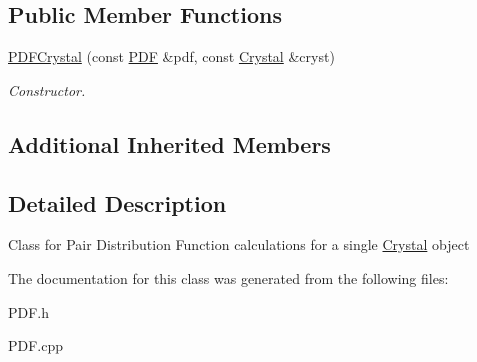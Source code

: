 \subsection*{Public Member Functions}
\begin{DoxyCompactItemize}
\item 
\mbox{\label{class_obj_cryst_1_1_p_d_f_crystal_a00392955dc22562f102b5161201df88e}} 
\mbox{\hyperlink{class_obj_cryst_1_1_p_d_f_crystal_a00392955dc22562f102b5161201df88e}{P\+D\+F\+Crystal}} (const \mbox{\hyperlink{class_obj_cryst_1_1_p_d_f}{P\+DF}} \&pdf, const \mbox{\hyperlink{class_obj_cryst_1_1_crystal}{Crystal}} \&cryst)
\begin{DoxyCompactList}\small\item\em Constructor. \end{DoxyCompactList}\end{DoxyCompactItemize}
\subsection*{Additional Inherited Members}


\subsection{Detailed Description}
Class for Pair Distribution Function calculations for a single \mbox{\hyperlink{class_obj_cryst_1_1_crystal}{Crystal}} object 

The documentation for this class was generated from the following files\+:\begin{DoxyCompactItemize}
\item 
P\+D\+F.\+h\item 
P\+D\+F.\+cpp\end{DoxyCompactItemize}
